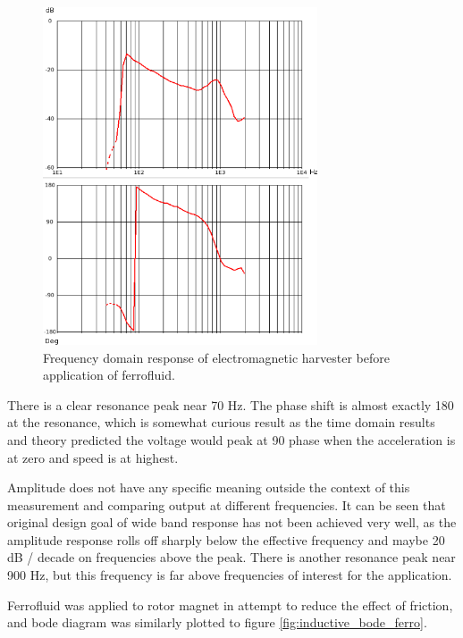 \begin{figure}[htb]
\begin{center}
\includegraphics[height=10cm]{images/own_measurement/generator_shaker/inductive_fd_dry.png}
\end{center}
\caption{\label{fig:inductive_fd_dry} Frequency domain response of electromagnetic harvester before application of ferrofluid.}
\end{figure}

There is a clear resonance peak near 70 Hz. The phase shift is almost exactly 180 \degree at the resonance, which is somewhat curious result as the time domain results and theory predicted the voltage would peak at 90 \degree phase when the acceleration is at zero and speed is at highest. 

Amplitude does not have any specific meaning outside the context of this measurement and comparing output at different frequencies. It can be seen that original design goal of wide band response has not been achieved very well, as the amplitude response rolls off sharply below the effective frequency and maybe 20 dB / decade on frequencies above the peak. There is another resonance peak near 900 Hz, but this frequency is far above frequencies of interest for the application. 

Ferrofluid was applied to rotor magnet in attempt to reduce the effect of friction, and bode diagram was similarly plotted to figure \ref{fig:inductive_bode_ferro}.

